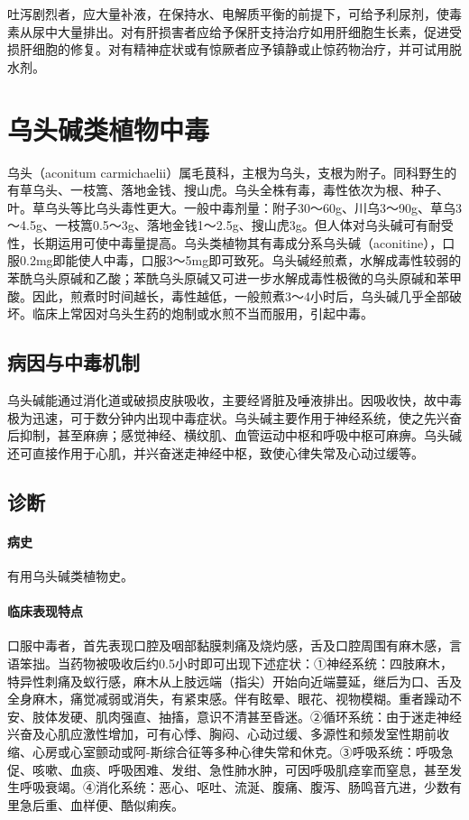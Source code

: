 吐泻剧烈者，应大量补液，在保持水、电解质平衡的前提下，可给予利尿剂，使毒素从尿中大量排出。对有肝损害者应给予保肝支持治疗如用肝细胞生长素，促进受损肝细胞的修复。对有精神症状或有惊厥者应予镇静或止惊药物治疗，并可试用脱水剂。

\protect\hypertarget{text00164.html}{}{}

\section{乌头碱类植物中毒}

乌头（aconitum
carmichaelii）属毛茛科，主根为乌头，支根为附子。同科野生的有草乌头、一枝篙、落地金钱、搜山虎。乌头全株有毒，毒性依次为根、种子、叶。草乌头等比乌头毒性更大。一般中毒剂量：附子30～60g、川乌3～90g、草乌3～4.5g、一枝篙0.5～3g、落地金钱1～2.5g、搜山虎3g。但人体对乌头碱可有耐受性，长期运用可使中毒量提高。乌头类植物其有毒成分系乌头碱（aconitine），口服0.2mg即能使人中毒，口服3～5mg即可致死。乌头碱经煎煮，水解成毒性较弱的苯酰乌头原碱和乙酸；苯酰乌头原碱又可进一步水解成毒性极微的乌头原碱和苯甲酸。因此，煎煮时时间越长，毒性越低，一般煎煮3～4小时后，乌头碱几乎全部破坏。临床上常因对乌头生药的炮制或水煎不当而服用，引起中毒。

\subsection{病因与中毒机制}

乌头碱能通过消化道或破损皮肤吸收，主要经肾脏及唾液排出。因吸收快，故中毒极为迅速，可于数分钟内出现中毒症状。乌头碱主要作用于神经系统，使之先兴奋后抑制，甚至麻痹；感觉神经、横纹肌、血管运动中枢和呼吸中枢可麻痹。乌头碱还可直接作用于心肌，并兴奋迷走神经中枢，致使心律失常及心动过缓等。

\subsection{诊断}

\paragraph{病史}

有用乌头碱类植物史。

\paragraph{临床表现特点}

口服中毒者，首先表现口腔及咽部黏膜刺痛及烧灼感，舌及口腔周围有麻木感，言语笨拙。当药物被吸收后约0.5小时即可出现下述症状：①神经系统：四肢麻木，特异性刺痛及蚁行感，麻木从上肢远端（指尖）开始向近端蔓延，继后为口、舌及全身麻木，痛觉减弱或消失，有紧束感。伴有眩晕、眼花、视物模糊。重者躁动不安、肢体发硬、肌肉强直、抽搐，意识不清甚至昏迷。②循环系统：由于迷走神经兴奋及心肌应激性增加，可有心悸、胸闷、心动过缓、多源性和频发室性期前收缩、心房或心室颤动或阿-斯综合征等多种心律失常和休克。③呼吸系统：呼吸急促、咳嗽、血痰、呼吸困难、发绀、急性肺水肿，可因呼吸肌痉挛而窒息，甚至发生呼吸衰竭。④消化系统：恶心、呕吐、流涎、腹痛、腹泻、肠鸣音亢进，少数有里急后重、血样便、酷似痢疾。

